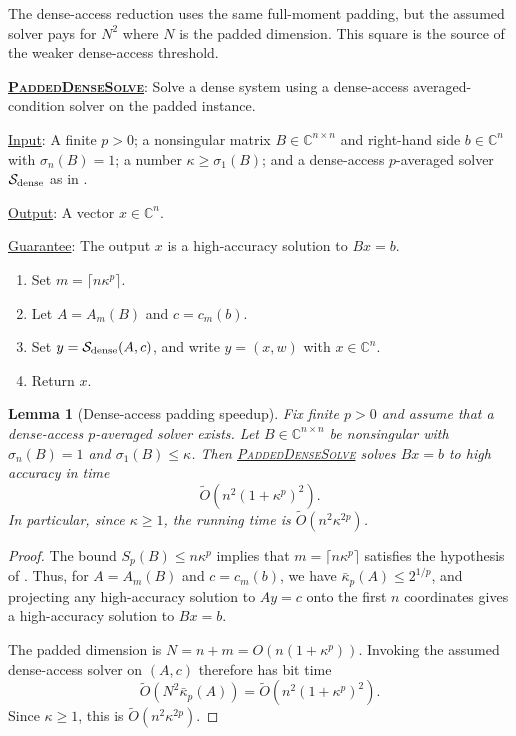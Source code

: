 \documentclass[11pt]{article}
\newenvironment{fminipage}%
  {\begin{Sbox}\begin{minipage}}%
  {\end{minipage}\end{Sbox}\fbox{\TheSbox}}
\newenvironment{algbox}[0]{%
\vskip 0.2in
\noindent
\begin{fminipage}{6.3in}
}{%
\end{fminipage}
\vskip 0.2in
}
\newtheorem{lemma}{Lemma}[section]
\begin{document}
The dense-access reduction uses the same full-moment padding, but the assumed
solver pays for $N^2$ where $N$ is the padded dimension.  This square is the
source of the weaker dense-access threshold.

\begin{algbox}
\textbf{\uline{\textsc{PaddedDenseSolve}}}: Solve a dense system using a
dense-access averaged-condition solver on the padded instance.
\label{alg:padded-dense-solve}

\uline{Input}: A finite $p>0$; a nonsingular matrix
$B\in\mathbb{C}^{n\times n}$ and right-hand side $b\in\mathbb{C}^n$ with
$\sigma_n(B)=1$; a number $\kappa\geq\sigma_1(B)$; and a dense-access
$p$-averaged solver $\mathcal{S}_{\rm dense}$ as in
.

\uline{Output}: A vector $x\in\mathbb{C}^n$.

\uline{Guarantee}: The output $x$ is a high-accuracy solution to $Bx=b$.

\begin{enumerate}[leftmargin=*]
  \item Set $m=\lceil n\kappa^p\rceil$.
  \item Let $A=A_m(B)$ and $c=c_m(b)$.
  \item Set $y=\mathcal{S}_{\rm dense}(A,c)$, and write $y=(x,w)$ with
  $x\in\mathbb{C}^n$.
  \item Return $x$.
\end{enumerate}
\end{algbox}

\begin{lemma}[Dense-access padding speedup]
\label{lem:dense-access-speedup}
Fix finite $p>0$ and assume that a dense-access $p$-averaged solver exists.
Let $B\in\mathbb{C}^{n\times n}$ be nonsingular with $\sigma_n(B)=1$ and
$\sigma_1(B)\leq\kappa$.  Then
\hyperref[alg:padded-dense-solve]{\textsc{PaddedDenseSolve}} solves $Bx=b$ to
high accuracy in time
\[
  \widetilde{O}(n^2(1+\kappa^p)^2).
\]
In particular, since $\kappa\geq 1$, the running time is
$\widetilde{O}(n^2\kappa^{2p})$.
\end{lemma}

\begin{proof}
The bound $S_p(B)\leq n\kappa^p$ implies that
$m=\lceil n\kappa^p\rceil$ satisfies the hypothesis of
.  Thus, for
$A=A_m(B)$ and $c=c_m(b)$, we have
$\bar{\kappa}_p(A)\leq 2^{1/p}$, and projecting any high-accuracy solution to
$Ay=c$ onto the first $n$ coordinates gives a high-accuracy solution to
$Bx=b$.

The padded dimension is $N=n+m=O(n(1+\kappa^p))$.  Invoking the assumed
dense-access solver on $(A,c)$ therefore has bit time
\[
  \widetilde{O}\left(N^2\bar{\kappa}_p(A)\right)
  =
  \widetilde{O}(n^2(1+\kappa^p)^2).
\]
Since $\kappa\geq1$, this is $\widetilde{O}(n^2\kappa^{2p})$.
\end{proof}
\end{document}
